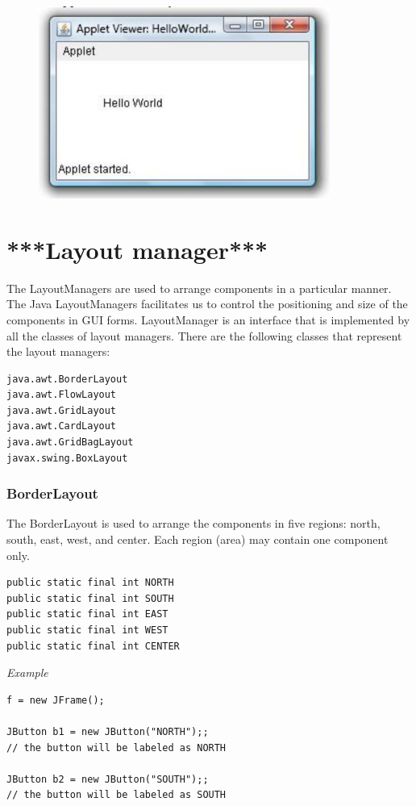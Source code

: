 \documentclass[twocolumn, a4paper]{article}
\begin{document}
\begin{figure}[h]
  \centering
  \includegraphics[width=\columnwidth]{apletviewer}
\end{figure}

\section{***Layout manager***}
The LayoutManagers are used to arrange components in a particular manner. The
Java LayoutManagers facilitates us to control the positioning and size of the
components in GUI forms. LayoutManager is an interface that is implemented by
all the classes of layout managers. There are the following classes that
represent the layout managers:
\begin{lstlisting}
java.awt.BorderLayout
java.awt.FlowLayout
java.awt.GridLayout
java.awt.CardLayout
java.awt.GridBagLayout
javax.swing.BoxLayout
\end{lstlisting}

\subsubsection{BorderLayout}
The BorderLayout is used to arrange the components in five regions: north,
south, east, west, and center. Each region (area) may contain one component
only.
\begin{lstlisting}
public static final int NORTH
public static final int SOUTH
public static final int EAST
public static final int WEST
public static final int CENTER
\end{lstlisting}

\vskip10pt
\noindent\emph{Example}
\begin{lstlisting}
f = new JFrame();

JButton b1 = new JButton("NORTH");;
// the button will be labeled as NORTH

JButton b2 = new JButton("SOUTH");;
// the button will be labeled as SOUTH
\end{lstlisting}
\end{document}
